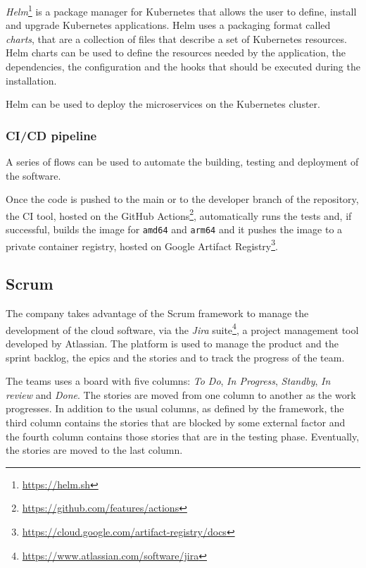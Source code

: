 \textit{Helm}\footnote{\url{https://helm.sh}} is a package manager for Kubernetes that allows the user to define, install and upgrade Kubernetes applications. Helm uses a packaging format called \textit{charts}, that are a collection of files that describe a set of Kubernetes resources. Helm charts can be used to define the resources needed by the application, the dependencies, the configuration and the hooks that should be executed during the installation.

Helm can be used to deploy the microservices on the Kubernetes cluster.

\subsubsection{CI/CD pipeline}

A series of flows can be used to automate the building, testing and deployment of the software.

Once the code is pushed to the main or to the developer branch of the repository, the CI tool, hosted on the GitHub Actions\footnote{\url{https://github.com/features/actions}}, automatically runs the tests and, if successful, builds the image for \texttt{amd64} and \texttt{arm64} and it pushes the image to a private container registry, hosted on Google Artifact Registry\footnote{\url{https://cloud.google.com/artifact-registry/docs}}.

\subsection{Scrum}

The company takes advantage of the Scrum framework to manage the development of the cloud software, via the \textit{Jira} suite\footnote{\url{https://www.atlassian.com/software/jira}}, a project management tool developed by Atlassian. The platform is used to manage the product and the sprint backlog, the epics and the stories and to track the progress of the team.

The teams uses a board with five columns: \textit{To Do}, \textit{In Progress}, \textit{Standby}, \textit{In review} and \textit{Done}. The stories are moved from one column to another as the work progresses. In addition to the usual columns, as defined by the framework, the third column contains the stories that are blocked by some external factor and the fourth column contains those stories that are in the testing phase. Eventually, the stories are moved to the last column.

